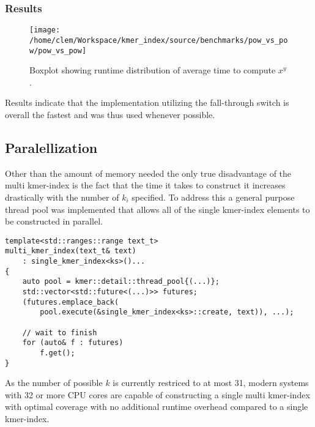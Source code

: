 \subsubsection{Results}
\begin{figure}[H]
\texttt{[image: /home/clem/Workspace/kmer\_index/source/benchmarks/pow\_vs\_pow/pow\_vs\_pow]}

\caption{Boxplot showing runtime distribution of average time to compute $x^{y}$.}
\end{figure}

Results indicate that the implementation utilizing the fall-through
switch is overall the fastest and was thus used whenever
possible.

\subsection{Paralellization}
Other than the amount of memory needed the only true disadvantage of the
multi kmer-index is the fact that the time it takes to construct it increases drastically with the
number of $k_{i}$ specified. To address this a general purpose thread pool was implemented that
allows all of the single kmer-index elements to be constructed in parallel.
\begin{minipage}{\linewidth}
\begin{lstlisting}[caption={Paralell invocation of the create function for individual kmer-index
elements during construction of the multi kmer-index.}]
template<std::ranges::range text_t>
multi_kmer_index(text_t& text)
	: single_kmer_index<ks>()...
{
	auto pool = kmer::detail::thread_pool{(...)};
	std::vector<std::future<(...)>> futures;
	(futures.emplace_back(
		pool.execute(&single_kmer_index<ks>::create, text)), ...);

	// wait to finish
	for (auto& f : futures)
		f.get();
}
\end{lstlisting}
\end{minipage}

As the number of possible $k$ is currently restriced to at most 31, modern systems with 32 or more CPU cores are
capable of constructing a single multi kmer-index with optimal coverage with no additional runtime overhead compared
to a single kmer-index.